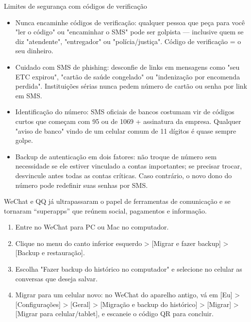 \begin{tcbwarn}{Limites de segurança com códigos de verificação}
\begin{itemize}
  \item Nunca encaminhe códigos de verificação: qualquer pessoa que peça para você "ler o código" ou "encaminhar o SMS" pode ser golpista — inclusive quem se diz "atendente", "entregador" ou "polícia/justiça". Código de verificação = o seu dinheiro.
  \item Cuidado com SMS de phishing: desconfie de links em mensagens como "seu ETC expirou", "cartão de saúde congelado" ou "indenização por encomenda perdida". Instituições sérias nunca pedem número de cartão ou senha por link em SMS.
  \item Identificação do número: SMS oficiais de bancos costumam vir de códigos curtos que começam com 95 ou de 1069 + assinatura da empresa. Qualquer "aviso de banco" vindo de um celular comum de 11 dígitos é quase sempre golpe.
  \item Backup de autenticação em dois fatores: não troque de número sem necessidade se ele estiver vinculado a contas importantes; se precisar trocar, desvincule antes todas as contas críticas. Caso contrário, o novo dono do número pode redefinir suas senhas por SMS.
\end{itemize}

\end{tcbwarn}


WeChat e QQ já ultrapassaram o papel de ferramentas de comunicação e se tornaram “superapps” que reúnem social, pagamentos e informação.


\begin{enumerate}
  \item Entre no WeChat para PC ou Mac no computador.
  \item Clique no menu do canto inferior esquerdo > [Migrar e fazer backup] > [Backup e restauração].
  \item Escolha "Fazer backup do histórico no computador" e selecione no celular as conversas que deseja salvar.
  \item Migrar para um celular novo: no WeChat do aparelho antigo, vá em [Eu] > [Configurações] > [Geral] > [Migração e backup do histórico] > [Migrar] > [Migrar para celular/tablet], e escaneie o código QR para concluir.
\end{enumerate}

